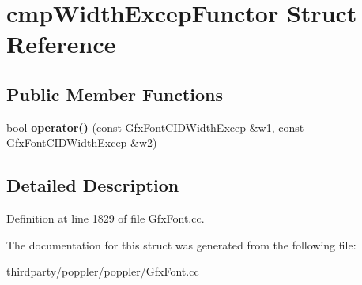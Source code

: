 \hypertarget{structcmp_width_excep_functor}{}\section{cmp\+Width\+Excep\+Functor Struct Reference}
\label{structcmp_width_excep_functor}
\subsection*{Public Member Functions}
\begin{DoxyCompactItemize}
\item 
\mbox{\label{structcmp_width_excep_functor_a11ad336a93ba708c2d04054b10e45488}} 
bool {\bfseries operator()} (const \hyperlink{struct_gfx_font_c_i_d_width_excep}{Gfx\+Font\+C\+I\+D\+Width\+Excep} \&w1, const \hyperlink{struct_gfx_font_c_i_d_width_excep}{Gfx\+Font\+C\+I\+D\+Width\+Excep} \&w2)
\end{DoxyCompactItemize}


\subsection{Detailed Description}


Definition at line 1829 of file Gfx\+Font.\+cc.



The documentation for this struct was generated from the following file\+:\begin{DoxyCompactItemize}
\item 
thirdparty/poppler/poppler/Gfx\+Font.\+cc\end{DoxyCompactItemize}
